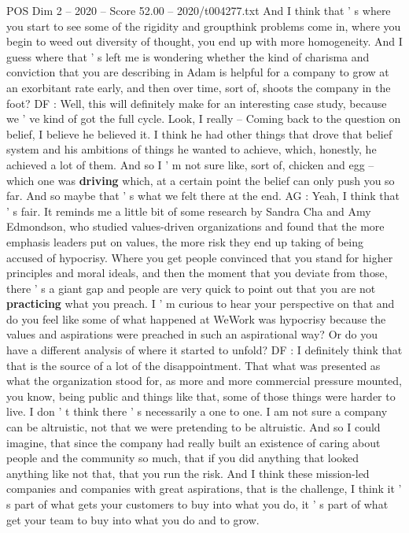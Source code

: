 \begin{textsample}{POS Dim 2 – 2020 – Score 52.00 – 2020/t004277.txt}
And I think that ' s where you start to see some of the rigidity and groupthink problems come in, where you begin to weed out diversity of thought, you end up with more homogeneity.
And I guess where that ' s left me is wondering whether the kind of charisma and conviction that you are describing in Adam is helpful for a company to grow at an exorbitant rate early, and then over time, sort of, shoots the company in the foot?
DF : Well, this will definitely make for an interesting case study, because we ' ve kind of got the full cycle.
Look, I really -- Coming back to the question on belief, I believe he believed it.
I think he had other things that drove that belief system and his ambitions of things he wanted to achieve, which, honestly, he achieved a lot of them.
And so I ' m not sure like, sort of, chicken and egg -- which one was \textbf{driving} which, at a certain point the belief can only push you so far.
And so maybe that ' s what we felt there at the end.
AG : Yeah, I think that ' s fair.
It reminds me a little bit of some research by Sandra Cha and Amy Edmondson, who studied values-driven organizations and found that the more emphasis leaders put on values, the more risk they end up taking of being accused of hypocrisy.
Where you get people convinced that you stand for higher principles and moral ideals, and then the moment that you deviate from those, there ' s a giant gap and people are very quick to point out that you are not \textbf{practicing} what you preach.
I ' m curious to hear your perspective on that and do you feel like some of what happened at WeWork was hypocrisy because the values and aspirations were preached in such an aspirational way?
Or do you have a different analysis of where it started to unfold?
DF : I definitely think that that is the source of a lot of the disappointment.
That what was presented as what the organization stood for, as more and more commercial pressure mounted, you know, being public and things like that, some of those things were harder to live.
I don ' t think there ' s necessarily a one to one.
I am not sure a company can be altruistic, not that we were pretending to be altruistic.
And so I could imagine, that since the company had really built an existence of caring about people and the community so much, that if you did anything that looked anything like not that, that you run the risk.
And I think these mission-led companies and companies with great aspirations, that is the challenge, I think it ' s part of what gets your customers to buy into what you do, it ' s part of what get your team to buy into what you do and to grow.

\end{textsample}
